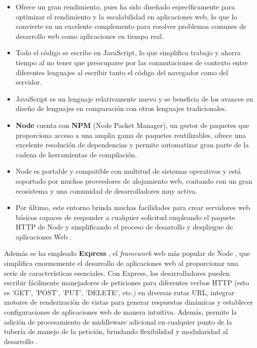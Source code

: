 \documentclass[11pt]{article}
\begin{document}
\begin{itemize}
\item Ofrece un gran rendimiento, pues ha sido diseñado específicamente para optimizar el rendimiento y la
escalabilidad en aplicaciones web, lo que lo convierte en un excelente complemento para resolver problemas comunes de desarrollo web como aplicaciones
en tiempo real. 
\item Todo el código se escribe en JavaScript, lo que simplifica trabajo y ahorra tiempo al no tener que preocuparse por las conmutaciones
de contexto entre diferentes lenguajes al escribir tanto el código del navegador como del servidor. 
\item JavaScript es un lenguaje relativamente nuevo y se beneficia de los avances en diseño de lenguajes en comparación con otros lenguajes tradicionales. 
\item \textbf{Node} cuenta con \textbf{NPM} (Node Packet Manager), un gestor de paquetes que proporciona acceso a una amplia gama de paquetes reutilizables, ofrece una excelente resolución de dependencias y permite automatizar
gran parte de la cadena de herramientas de compilación. 
\item Node es portable y compatible con multitud de sistemas operativos y está soportado por muchos proveedores de alojamiento web, contando con un gran ecosistema y una comunidad de desarrolladores muy activa. 
\item Por último, este entorno brinda muchas facilidades para crear servidores web básicos capaces de responder a cualquier solicitud empleando el paquete HTTP de Node y simplificando el proceso de desarrollo y despliegue de
aplicaciones Web \cite{node-express}.
\end{itemize}

Además se ha empleado \textbf{Express} \cite{express}, el \textit{framework} web más popular de Node \cite{express-popular}, que simplifica enormemente el desarrollo de aplicaciones web al proporcionar
una serie de características esenciales. Con Express, los desarrolladores pueden escribir fácilmente manejadores de peticiones para diferentes 
verbos HTTP (esto es 'GET', 'POST', 'PUT', 'DELETE', etc.) en diversas rutas URL, integrar motores de renderización de vistas para generar respuestas dinámicas y establecer configuraciones de 
aplicaciones web de manera intuitiva. Además, permite la adición de procesamiento de middleware adicional en cualquier punto de la tubería de manejo de 
la petición, brindando flexibilidad y modularidad al desarrollo \cite{node-express}. 
\end{document}
